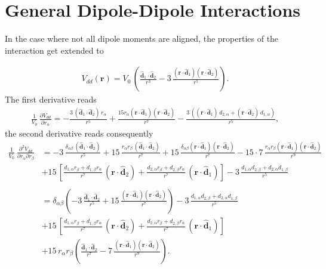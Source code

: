 \section*{General Dipole-Dipole Interactions}
In the case where not all dipole moments are aligned, the properties of the interaction get extended to 

\begin{align*}
    V_{dd}(\mathbf{r}) = V_0\,\left(\frac{\mathbf{\hat{d}}_1\cdot\mathbf{\hat{d}}_2}{r^3}-3\,\frac{(\mathbf{r}\cdot \mathbf{\hat{d}}_1)(\mathbf{r}\cdot \mathbf{\hat{d}}_2)}{r^5}\right).
\end{align*}
The first derivative reads
\begin{align*}
    \frac{1}{V_0}\,\frac{\partial V_{dd}}{\partial r_\alpha} = -\frac{3\,(\mathbf{\hat{d}}_1\cdot\mathbf{\hat{d}}_2)\, r_\alpha}{r^5} + \frac{15 r_\alpha (\mathbf{r}\cdot \mathbf{\hat{d}}_1)(\mathbf{r}\cdot \mathbf{\hat{d}}_2)}{r^7} - \frac{3\,\left( (\mathbf{r}\cdot \mathbf{\hat{d}}_1)\, d_{2,\alpha} +(\mathbf{r}\cdot \mathbf{\hat{d}}_2)\, d_{1,\alpha}\right)}{r^5},
\end{align*}
the second derivative reads consequently
\begin{align*}
    \frac{1}{V_0}\,\frac{\partial^2 V_{dd}}{\partial r_\alpha \partial r_\beta} &= -3\,\frac{\delta_{\alpha\beta}\,(\mathbf{\hat{d}}_1\cdot\mathbf{\hat{d}}_2)}{r^5} + 15\, \frac{r_\alpha r_\beta\,(\mathbf{\hat{d}}_1\cdot\mathbf{\hat{d}}_2)}{r^7} + 15 \,\frac{\delta_{\alpha\beta} (\mathbf{r}\cdot \mathbf{\hat{d}}_1)(\mathbf{r}\cdot \mathbf{\hat{d}}_2)}{r^7} - 15\cdot7\, \frac{r_\alpha r_\beta (\mathbf{r}\cdot \mathbf{\hat{d}}_1)(\mathbf{r}\cdot \mathbf{\hat{d}}_2)}{r^9} \\
    &+15\,\left[\frac{d_{1,\alpha} r_\beta + d_{1,\beta} r_\alpha}{r^7}\,(\mathbf{r}\cdot \mathbf{\hat{d}}_2) + \frac{d_{2,\alpha} r_\beta + d_{2,\beta} r_\alpha}{r^7}\,(\mathbf{r}\cdot \mathbf{\hat{d}}_1) \right] - 3\, \frac{d_{1,\alpha} d_{2,\beta} + d_{2,\alpha} d_{1,\beta}}{r^5}\\\\
    &= \delta_{\alpha\beta}\left(-3\,\frac{\mathbf{\hat{d}}_1\cdot\mathbf{\hat{d}}_2}{r^5} + 15\, \frac{(\mathbf{r}\cdot \mathbf{\hat{d}}_1)(\mathbf{r}\cdot \mathbf{\hat{d}}_2)}{r^7}\right)- 3\, \frac{d_{1,\alpha} d_{2,\beta} + d_{2,\alpha} d_{1,\beta}}{r^5} \\
    &+ 15\,\left[\frac{d_{1,\alpha} r_\beta + d_{1,\beta} r_\alpha}{r^7}\,(\mathbf{r}\cdot \mathbf{\hat{d}}_2) + \frac{d_{2,\alpha} r_\beta + d_{2,\beta} r_\alpha}{r^7}\,(\mathbf{r}\cdot \mathbf{\hat{d}}_1) \right] \\
    &+ 15\,r_\alpha r_\beta \left( \frac{\mathbf{\hat{d}}_1\cdot\mathbf{\hat{d}}_2}{r^7} - 7\, \frac{(\mathbf{r}\cdot \mathbf{\hat{d}}_1)(\mathbf{r}\cdot \mathbf{\hat{d}}_2)}{r^9}\right).
\end{align*}


